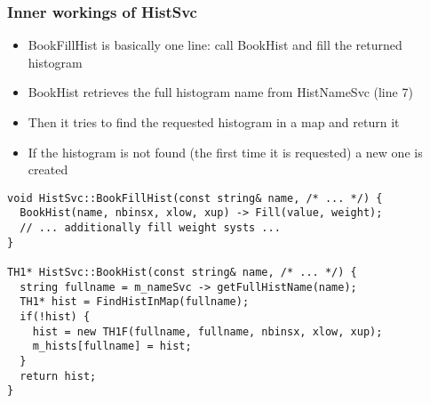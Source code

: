 \documentclass{beamer}
\begin{document}
\begin{frame}[fragile,t]
\frametitle{Inner workings of HistSvc}
\begin{itemize}
 \item BookFillHist is basically one line: call BookHist and fill the returned histogram
 \item BookHist retrieves the full histogram name from HistNameSvc (line 7)
 \item Then it tries to find the requested histogram in a map and return it
 \item If the histogram is not found (the first time it is requested) a new one is created
\end{itemize}
\begin{center}
\begin{minipage}{0.9\textwidth}
{\tiny
\begin{lstlisting}
void HistSvc::BookFillHist(const string& name, /* ... */) {
  BookHist(name, nbinsx, xlow, xup) -> Fill(value, weight);
  // ... additionally fill weight systs ...
}

TH1* HistSvc::BookHist(const string& name, /* ... */) {
  string fullname = m_nameSvc -> getFullHistName(name);
  TH1* hist = FindHistInMap(fullname);
  if(!hist) {
    hist = new TH1F(fullname, fullname, nbinsx, xlow, xup);
    m_hists[fullname] = hist;
  }
  return hist;
}
\end{lstlisting}
}
\end{minipage}
\end{center}
\end{frame}
\end{document}
